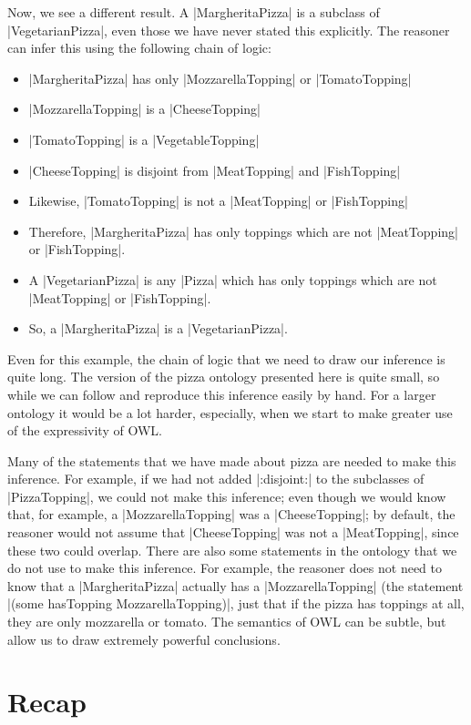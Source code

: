 Now, we see a different result. A |MargheritaPizza| is a subclass of
|VegetarianPizza|, even those we have never stated this explicitly.
The reasoner can infer this using the following chain of logic:

\begin{itemize}
\item |MargheritaPizza| has only |MozzarellaTopping| or |TomatoTopping|
\item |MozzarellaTopping| is a |CheeseTopping|
\item |TomatoTopping| is a |VegetableTopping|
\item |CheeseTopping| is disjoint from |MeatTopping| and |FishTopping|
\item Likewise, |TomatoTopping| is not a |MeatTopping| or |FishTopping|
\item Therefore, |MargheritaPizza| has only toppings which are not
  |MeatTopping| or |FishTopping|.
\item A |VegetarianPizza| is any |Pizza| which has only toppings which are not
  |MeatTopping| or |FishTopping|.
\item So, a |MargheritaPizza| is a |VegetarianPizza|.
\end{itemize}

Even for this example, the chain of logic that we need to draw our
inference is quite long. The version of the pizza ontology presented
here is quite small, so while we can follow and reproduce this
inference easily by hand. For a larger ontology it would be a lot
harder, especially, when we start to make greater use of the
expressivity of OWL.

Many of the statements that we have made about pizza are needed to make this
inference. For example, if we had not added |:disjoint:| to the subclasses of
|PizzaTopping|, we could not make this inference; even though we would know
that, for example, a |MozzarellaTopping| was a |CheeseTopping|; by default,
the reasoner would not assume that |CheeseTopping| was not a |MeatTopping|,
since these two could overlap. There are also some statements in the ontology
that we do not use to make this inference. For example, the reasoner does not
need to know that a |MargheritaPizza| actually has a |MozzarellaTopping| (the
statement |(some hasTopping MozzarellaTopping)|, just that if the pizza has
toppings at all, they are only mozzarella or tomato. The semantics of OWL can
be subtle, but allow us to draw extremely powerful conclusions.

\section{Recap}
\label{sec:recap-1}

